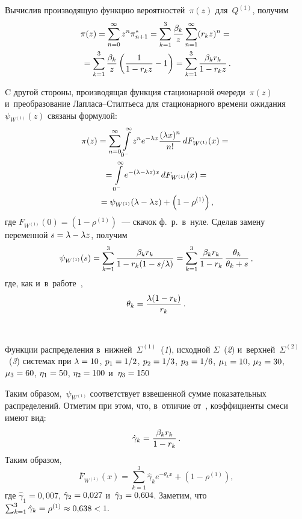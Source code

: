 \begin{multicols}{2}
Вычислив производящую функцию вероятностей~$\pi (z)$ для~$Q^{(1)}$, получим
\begin{multline*}
    \pi (z)=\sum\limits_{n=0}^\infty z^n \pi_{n+1}^\ast = \sum\limits_{k=1}^3
    \displaystyle\frac{\displaystyle \beta_k \mathstrut}{\displaystyle z\mathstrut}\sum\limits_{n=1}^\infty (r_k z)^n={}\\
    {}=\sum\limits_{k=1}^3 \displaystyle\frac{\displaystyle \beta_k \mathstrut}{\displaystyle z\mathstrut}\left(\displaystyle\frac{\displaystyle 1\mathstrut}{\displaystyle 1-r_k z\mathstrut}-1\right)=\sum\limits_{k=1}^3 \displaystyle\frac{\displaystyle \beta_k r_k\mathstrut}{\displaystyle 1-r_k z\mathstrut}\,.
\end{multline*}

C другой стороны,  производящая функция стационарной очереди~$\pi(z)$ и~преобразование Лап\-ла\-са--Стилть\-еса для стационарного времени 
ожидания~$\psi_{W^{(1)}}(z)$ связаны формулой:
\begin{multline*}
\pi(z)= \sum\limits_{n=0}^{\infty}  \int\limits_{0^-}^{\infty} z^n e^{-\lambda x} \displaystyle\frac{\displaystyle (\lambda x )^n\mathstrut}{\displaystyle n!\mathstrut}\, dF_{W^{(1)}} (x) ={}\\
{}=
\int\limits_{0^-}^{\infty} e^{-(\lambda-\lambda z) x} \, d F_{W^{(1)}} (x) ={}\\
{}=\psi_{W^{(1)}} (\lambda - \lambda z) + \left(1-\rho^{(1)}\right),
\end{multline*}
 где $F_{W^{(1)}}(0) = (1-\rho^{(1)})$~--- скачок  ф.~р.\ в~нуле. Сделав замену 
переменной $s\hm=\lambda\hm-\lambda z$,  получим
$$
\psi_{W^{(1)}} (s)=\sum_{k=1}^3 \displaystyle\frac{\displaystyle \beta_k r_k\mathstrut}{\displaystyle 1-r_k(1-
s/\lambda)\mathstrut}=\sum\limits_{k=1}^3 \displaystyle\frac{\displaystyle \beta_k r_k\mathstrut}{\displaystyle 1-r_k\mathstrut}\,\displaystyle\frac{\displaystyle \theta_k\mathstrut}{\displaystyle \theta_k+ s\mathstrut}\,,
$$
где, как и~в~работе~\cite{rego},
$$
\theta_k=\displaystyle\frac{\displaystyle \lambda(1-r_k)\mathstrut}{\displaystyle r_k\mathstrut}\,.
$$

{ \begin{center}  %
 \vspace*{-1pt}
     \mbox{%
\epsfxsize=79mm 
}

\end{center}



\noindent
{\small{Функции распределения в~нижней~$\Sigma^{(1)}$~(\textit{1}), исходной $\Sigma$~(\textit{2}) 
и~верх\-ней~$\Sigma^{(2)}$~(\textit{3}) сис\-те\-мах при $\lambda \hm= 10$, $p_1\hm= 1/2$, $p_2\hm= 1/3$, $p_3\hm=1/6$, 
$\mu_1\hm=10$, $\mu_2\hm=30$, $\mu_3\hm= 60$, $\eta_1\hm=50$, $\eta_2\hm=100$ и~$\eta_3\hm=150$}}}

\vspace*{12pt}

\noindent
Таким образом,~$\psi_{W^{(1)}}$ соответствует взвешенной  сумме показательных 
распределений. Отметим при этом, что, в~отличие от~\cite{rego}, коэффициенты 
смеси имеют вид:
$$
\hat\gamma_k=\displaystyle\frac{\displaystyle \beta_k r_k\mathstrut}{\displaystyle 1-r_k\mathstrut}\,.
$$
Таким образом,
\begin{equation}
\label{fwlower}
\overline F_{W^{(1)}}(x)=\sum\limits_{k=1}^3 \hat\gamma_k e^{-\theta_k x} + \left(1- \rho^{(1)}\right),
\end{equation}
где
$\hat\gamma_1=0{,}007$, $\hat\gamma_2\hm=0{,}027$ и~$\hat\gamma_3\hm=0{,}604$. Заметим, что 
$\sum\nolimits_{k=1}^3 \hat\gamma_k\hm=\rho^{(1)}\hm\approx 0{,}638\hm <1.$


\end{multicols}
